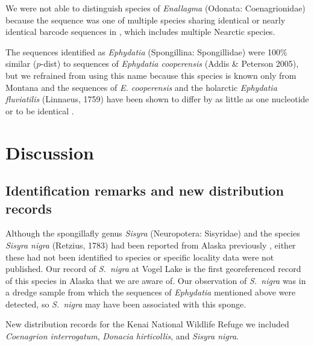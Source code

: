 \begin{multicols}{2}

We were not able to distinguish species of \textit{Enallagma} (Odonata: Coenagrionidae) because the sequence was one of multiple species sharing identical or nearly identical  barcode sequences in  , which includes multiple Nearctic species\citep{Geigeretal2021}.

The sequences identified as \textit{Ephydatia} (Spongillina: Spongillidae) were 100\% similar ($p$-dist) to sequences of \textit{Ephydatia cooperensis} (Addis \& Peterson 2005), but we refrained from using this name because this species is known only from Montana \citet{Mazzacano2008} and the  sequences of \textit{E. cooperensis} and the holarctic \textit{Ephydatia fluviatilis} (Linnaeus, 1759) have been shown to differ by as little as one nucleotide \citep{AddisPeterson2005} or to be identical \citep{Meixneretal2007}.



\section{Discussion}

\subsection{Identification remarks and new distribution records}

Although the spongillafly genus \textit{Sisyra} (Neuropotera: Sisyridae) and the species \textit{Sisyra nigra} (Retzius, 1783) had been reported from Alaska previously \citep{Bowles2006, Sikes2022}, either these had not been identified to species or specific locality data were not published. Our record of \textit{S.\ nigra} at Vogel Lake is the first georeferenced record of this species in Alaska that we are aware of. Our observation of \textit{S.\ nigra} was in a dredge sample from which the sequences of \textit{Ephydatia} mentioned above were detected, so \textit{S.\ nigra} may have been associated with this sponge. 

New distribution records for the Kenai National Wildlife Refuge we included 
\textit{Coenagrion interrogatum}, 
\textit{Donacia hirticollis}, and  
\textit{Sisyra nigra}.

\end{multicols}
